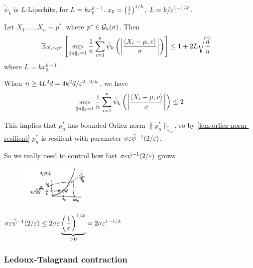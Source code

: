 $\tilde{\psi}_k$ is $L$-Lipschitz, for $L = k x_0^{k-1}$.
$x_0 = \left(\frac{1}{\varepsilon}\right)^{1/k}$, $L = k / \varepsilon^{1 - 1/k}$.

\begin{proposition}\label{prop:truncated-moments-bound}
  Let $X_1, \ldots, X_n \sim p^*$, where $p^* \in \mathcal{G}_k(\sigma)$. Then
  \begin{align}
    \mathbb{E}_{X_i \sim p^*}\left[
      \sup_{\|u\|_2 = 1} \frac{1}{n} \sum_{i=1}^n \tilde{\psi}_k\left(
        \left\lvert \frac{\braket{X_i - \mu, v}}{\sigma}\right\rvert
      \right)
    \right]
    &\leq 1 + 2 L \sqrt{\frac{d}{n}}
  \end{align}
  where $L = k x_0^{k-1}$.
\end{proposition}

\begin{remark}
  When  $n \geq 4 L^2 d = 4 k^2 d / \varepsilon^{2 - 2/k}$, we have
  \begin{align}
    \sup_{\|u\|_2 = 1} \frac{1}{n} \sum_{i=1}^n \tilde{\psi}_k\left(
      \left\lvert \frac{\braket{X_i - \mu, v}}{\sigma}\right\rvert
    \right)
    \leq 2
  \end{align}

  This implies that $p_n^*$ has bounded Orlicz norm
  $\|p_n^*\|_{\tilde{\psi}_k}$, so by \cref{lem:orlicz-norm-resilient}
  $p_n^*$ is resilient with parameter $\sigma \varepsilon \tilde{\psi}^{-1}(2/\varepsilon)$.

  So we really need to control how fast $\sigma \varepsilon \tilde{\psi}^{-1}(2/\varepsilon)$
  grows.


\begin{figure}[H]
\begin{center}
  \includegraphics[width=0.3\textwidth]{figures/9-17-6.png}
\end{center}
\end{figure}
$\sigma \varepsilon \tilde{\psi}^{-1}(2/\varepsilon) \leq 2 \sigma
  \varepsilon \underbrace{\left(\frac{1}{\varepsilon}\right)^{1/k}}_{> 0}
  = 2 \sigma \varepsilon^{1 - 1/k}$
\end{remark}

\subsubsection{Ledoux-Talagrand contraction}%

